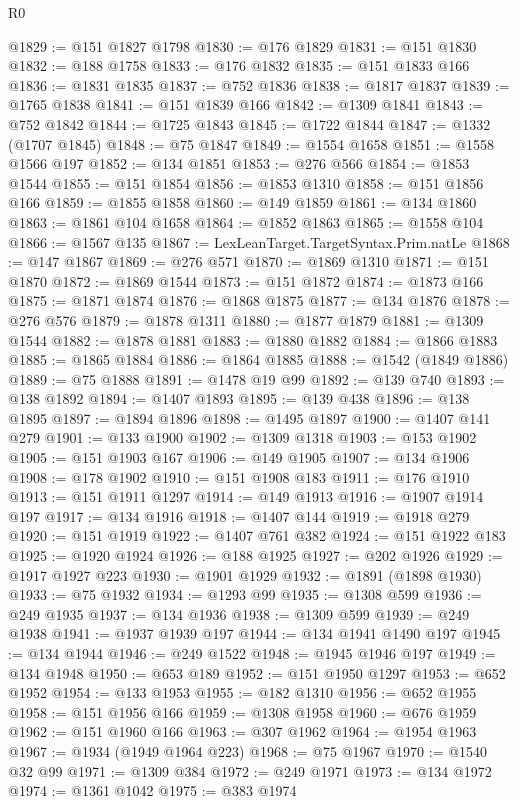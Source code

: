 \begin{lexlean}{R0}
\begin{coremodule}
@1829 := @151 @1827 @1798
@1830 := @176 @1829
@1831 := @151 @1830
@1832 := @188 @1758
@1833 := @176 @1832
@1835 := @151 @1833 @166
@1836 := @1831 @1835
@1837 := @752 @1836
@1838 := @1817 @1837
@1839 := @1765 @1838
@1841 := @151 @1839 @166
@1842 := @1309 @1841
@1843 := @752 @1842
@1844 := @1725 @1843
@1845 := @1722 @1844
@1847 := @1332 (@1707 @1845)
@1848 := @75 @1847
@1849 := @1554 @1658
@1851 := @1558 @1566 @197
@1852 := @134 @1851
@1853 := @276 @566
@1854 := @1853 @1544
@1855 := @151 @1854
@1856 := @1853 @1310
@1858 := @151 @1856 @166
@1859 := @1855 @1858
@1860 := @149 @1859
@1861 := @134 @1860
@1863 := @1861 @104 @1658
@1864 := @1852 @1863
@1865 := @1558 @104
@1866 := @1567 @135
@1867 := LexLeanTarget.TargetSyntax.Prim.natLe
@1868 := @147 @1867
@1869 := @276 @571
@1870 := @1869 @1310
@1871 := @151 @1870
@1872 := @1869 @1544
@1873 := @151 @1872
@1874 := @1873 @166
@1875 := @1871 @1874
@1876 := @1868 @1875
@1877 := @134 @1876
@1878 := @276 @576
@1879 := @1878 @1311
@1880 := @1877 @1879
@1881 := @1309 @1544
@1882 := @1878 @1881
@1883 := @1880 @1882
@1884 := @1866 @1883
@1885 := @1865 @1884
@1886 := @1864 @1885
@1888 := @1542 (@1849 @1886)
@1889 := @75 @1888
@1891 := @1478 @19 @99
@1892 := @139 @740
@1893 := @138 @1892
@1894 := @1407 @1893
@1895 := @139 @438
@1896 := @138 @1895
@1897 := @1894 @1896
@1898 := @1495 @1897
@1900 := @1407 @141 @279
@1901 := @133 @1900
@1902 := @1309 @1318
@1903 := @153 @1902
@1905 := @151 @1903 @167
@1906 := @149 @1905
@1907 := @134 @1906
@1908 := @178 @1902
@1910 := @151 @1908 @183
@1911 := @176 @1910
@1913 := @151 @1911 @1297
@1914 := @149 @1913
@1916 := @1907 @1914 @197
@1917 := @134 @1916
@1918 := @1407 @144
@1919 := @1918 @279
@1920 := @151 @1919
@1922 := @1407 @761 @382
@1924 := @151 @1922 @183
@1925 := @1920 @1924
@1926 := @188 @1925
@1927 := @202 @1926
@1929 := @1917 @1927 @223
@1930 := @1901 @1929
@1932 := @1891 (@1898 @1930)
@1933 := @75 @1932
@1934 := @1293 @99
@1935 := @1308 @599
@1936 := @249 @1935
@1937 := @134 @1936
@1938 := @1309 @599
@1939 := @249 @1938
@1941 := @1937 @1939 @197
@1944 := @134 @1941 @1490 @197
@1945 := @134 @1944
@1946 := @249 @1522
@1948 := @1945 @1946 @197
@1949 := @134 @1948
@1950 := @653 @189
@1952 := @151 @1950 @1297
@1953 := @652 @1952
@1954 := @133 @1953
@1955 := @182 @1310
@1956 := @652 @1955
@1958 := @151 @1956 @166
@1959 := @1308 @1958
@1960 := @676 @1959
@1962 := @151 @1960 @166
@1963 := @307 @1962
@1964 := @1954 @1963
@1967 := @1934 (@1949 @1964 @223)
@1968 := @75 @1967
@1970 := @1540 @32 @99
@1971 := @1309 @384
@1972 := @249 @1971
@1973 := @134 @1972
@1974 := @1361 @1042
@1975 := @383 @1974

\end{coremodule}
\end{lexlean}
